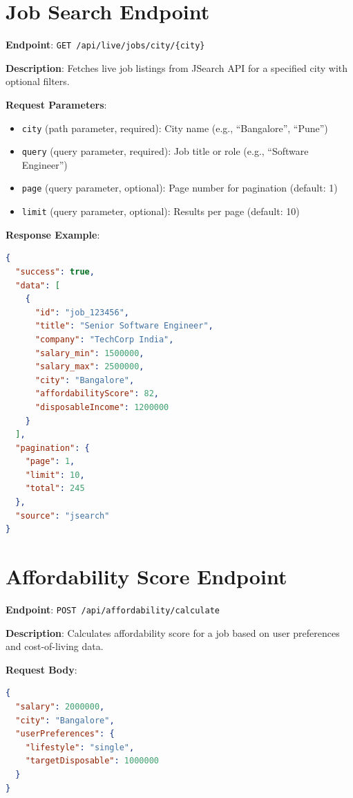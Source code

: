 \documentclass[12pt,a4paper,oneside]{report}
\begin{document}
\section{Job Search Endpoint}

\textbf{Endpoint}: \texttt{GET /api/live/jobs/city/\{city\}}

\textbf{Description}: Fetches live job listings from JSearch API for a specified city with optional filters.

\textbf{Request Parameters}:
\begin{itemize}
    \item \texttt{city} (path parameter, required): City name (e.g., ``Bangalore'', ``Pune'')
    \item \texttt{query} (query parameter, required): Job title or role (e.g., ``Software Engineer'')
    \item \texttt{page} (query parameter, optional): Page number for pagination (default: 1)
    \item \texttt{limit} (query parameter, optional): Results per page (default: 10)
\end{itemize}

\textbf{Response Example}:
\begin{lstlisting}[language=json]
{
  "success": true,
  "data": [
    {
      "id": "job_123456",
      "title": "Senior Software Engineer",
      "company": "TechCorp India",
      "salary_min": 1500000,
      "salary_max": 2500000,
      "city": "Bangalore",
      "affordabilityScore": 82,
      "disposableIncome": 1200000
    }
  ],
  "pagination": {
    "page": 1,
    "limit": 10,
    "total": 245
  },
  "source": "jsearch"
}
\end{lstlisting}

\section{Affordability Score Endpoint}

\textbf{Endpoint}: \texttt{POST /api/affordability/calculate}

\textbf{Description}: Calculates affordability score for a job based on user preferences and cost-of-living data.

\textbf{Request Body}:
\begin{lstlisting}[language=json]
{
  "salary": 2000000,
  "city": "Bangalore",
  "userPreferences": {
    "lifestyle": "single",
    "targetDisposable": 1000000
  }
}
\end{lstlisting}
\end{document}
